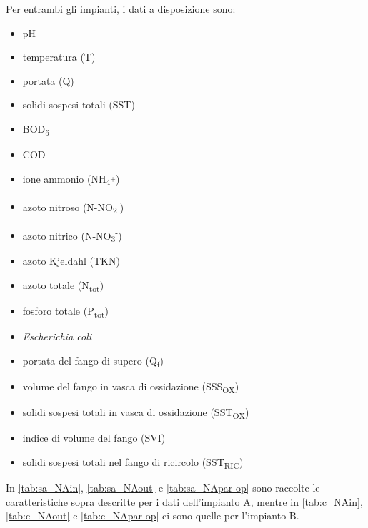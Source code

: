 Per entrambi gli impianti, i dati a disposizione sono: 
\begin{itemize}
	\item pH
	\item temperatura (T)
	\item portata (Q)
	\item solidi sospesi totali (SST)
	\item BOD\textsubscript{5}
	\item COD
	\item ione ammonio (NH\textsubscript{4\textsuperscript{+}})
	\item azoto nitroso (N-NO\textsubscript{2}\textsuperscript{-})
	\item azoto nitrico (N-NO\textsubscript{3}\textsuperscript{-})
	\item azoto Kjeldahl (TKN)
	\item azoto totale (N\textsubscript{tot})
	\item fosforo totale (P\textsubscript{tot})
	\item \textit{Escherichia coli}
	\item portata del fango di supero (Q\textsubscript{f})
	\item volume del fango in vasca di ossidazione (SSS\textsubscript{OX})
	\item solidi sospesi totali in vasca di ossidazione (SST\textsubscript{OX})
	\item indice di volume del fango (SVI)
	\item solidi sospesi totali nel fango di ricircolo (SST\textsubscript{RIC})
	
\end{itemize}

In \autoref{tab:sa_NAin}, \autoref{tab:sa_NAout} e \autoref{tab:sa_NApar-op} sono raccolte le caratteristiche sopra descritte per i dati dell'impianto A, mentre in \autoref{tab:c_NAin}, \autoref{tab:c_NAout} e \autoref{tab:c_NApar-op} ci sono quelle per l'impianto B.


